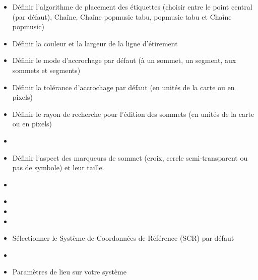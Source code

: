 
\begin{itemize}[label=--]
\item Définir l'algorithme de placement des étiquettes (choisir entre le point central (par défaut), Chaîne, Chaîne popmusic tabu, popmusic tabu et Chaîne popmusic)
\end{itemize}


\begin{itemize}[label=--]
\item Définir la couleur et la largeur de la ligne d'étirement
\item Définir le mode d'accrochage par défaut (à un sommet, un segment, aux sommets et segments)
\item Définir la tolérance d'accrochage par défaut (en unités de la carte ou en pixels) 
\item Définir le rayon de recherche pour l'édition des sommets (en unités de la carte ou en pixels)
\item {}
\item Définir l'aspect des marqueurs de sommet (croix, cercle semi-transparent ou pas de symbole) et leur taille.
\item {}
\end{itemize}


\begin{itemize}[label=--]
\item {}
\item {}
\item {}
\item Sélectionner le Système de Coordonnées de Référence (SCR) par défaut
\end{itemize}


\begin{itemize}[label=--]
\item {}
\item Paramètres de lieu sur votre système
\end{itemize}

